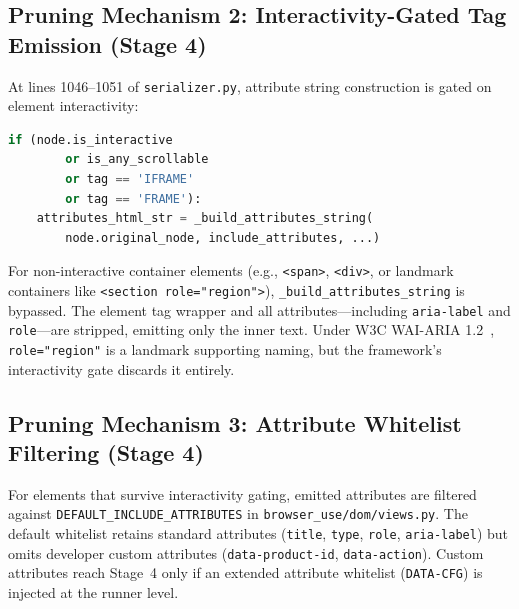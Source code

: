 \documentclass[conference]{IEEEtran}
\begin{document}
\subsection{Pruning Mechanism 2: Interactivity-Gated Tag Emission (Stage 4)}
At lines 1046--1051 of \texttt{serializer.py}, attribute string construction is gated on element interactivity:
\begin{lstlisting}[language=Python]
if (node.is_interactive
        or is_any_scrollable
        or tag == 'IFRAME'
        or tag == 'FRAME'):
    attributes_html_str = _build_attributes_string(
        node.original_node, include_attributes, ...)
\end{lstlisting}
For non-interactive container elements (e.g., \texttt{<span>}, \texttt{<div>}, or landmark containers like \texttt{<section role="region">}), \texttt{\_build\_attributes\_string} is bypassed. The element tag wrapper and all attributes---including \texttt{aria-label} and \texttt{role}---are stripped, emitting only the inner text. Under W3C WAI-ARIA 1.2~\cite{wai_aria12}, \texttt{role="region"} is a landmark supporting naming, but the framework's interactivity gate discards it entirely.

\subsection{Pruning Mechanism 3: Attribute Whitelist Filtering (Stage 4)}
For elements that survive interactivity gating, emitted attributes are filtered against \texttt{DEFAULT\_INCLUDE\_ATTRIBUTES} in \texttt{browser\_use/dom/views.py}. The default whitelist retains standard attributes (\texttt{title}, \texttt{type}, \texttt{role}, \texttt{aria-label}) but omits developer custom attributes (\texttt{data-product-id}, \texttt{data-action}). Custom attributes reach Stage~4 only if an extended attribute whitelist (\texttt{DATA-CFG}) is injected at the runner level.
\end{document}
